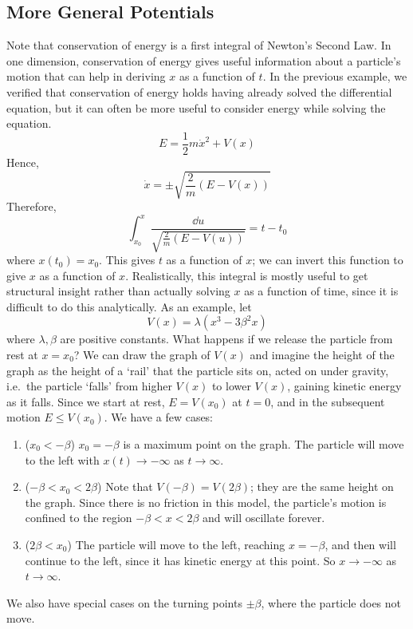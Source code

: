 \subsection{More General Potentials}
Note that conservation of energy is a first integral of Newton's Second Law.
In one dimension, conservation of energy gives useful information about a particle's motion that can help in deriving \(x\) as a function of \(t\).
In the previous example, we verified that conservation of energy holds having already solved the differential equation, but it can often be more useful to consider energy while solving the equation.
\[
	E = \frac{1}{2}m\dot x^2 + V(x)
\]
Hence,
\[
	\dot x = \pm \sqrt{\frac{2}{m}(E - V(x))}
\]
Therefore,
\[
	\int_{x_0}^x \frac{\dd{u}}{\sqrt{\frac{2}{m}(E - V(u))}} = t - t_0
\]
where \(x(t_0) = x_0\).
This gives \(t\) as a function of \(x\); we can invert this function to give \(x\) as a function of \(x\).
Realistically, this integral is mostly useful to get structural insight rather than actually solving \(x\) as a function of time, since it is difficult to do this analytically.
As an example, let
\[
	V(x) = \lambda(x^3 - 3 \beta^2 x)
\]
where \(\lambda, \beta\) are positive constants.
What happens if we release the particle from rest at \(x=x_0\)? We can draw the graph of \(V(x)\) and imagine the height of the graph as the height of a `rail' that the particle sits on, acted on under gravity, i.e.\ the particle `falls' from higher \(V(x)\) to lower \(V(x)\), gaining kinetic energy as it falls.
Since we start at rest, \(E = V(x_0)\) at \(t=0\), and in the subsequent motion \(E \leq V(x_0)\).
We have a few cases:
\begin{enumerate}[{Case} 1:]
	\item (\(x_0 < -\beta\)) \(x_0 = -\beta\) is a maximum point on the graph.
	      The particle will move to the left with \(x(t) \to -\infty\) as \(t \to \infty\).
	\item (\(-\beta < x_0 < 2\beta\)) Note that \(V(-\beta) = V(2\beta)\); they are the same height on the graph.
	      Since there is no friction in this model, the particle's motion is confined to the region \(-\beta < x < 2\beta\) and will oscillate forever.
	\item (\(2\beta < x_0\)) The particle will move to the left, reaching \(x=-\beta\), and then will continue to the left, since it has kinetic energy at this point.
	      So \(x \to -\infty\) as \(t \to \infty\).
\end{enumerate}
We also have special cases on the turning points \(\pm\beta\), where the particle does not move.
